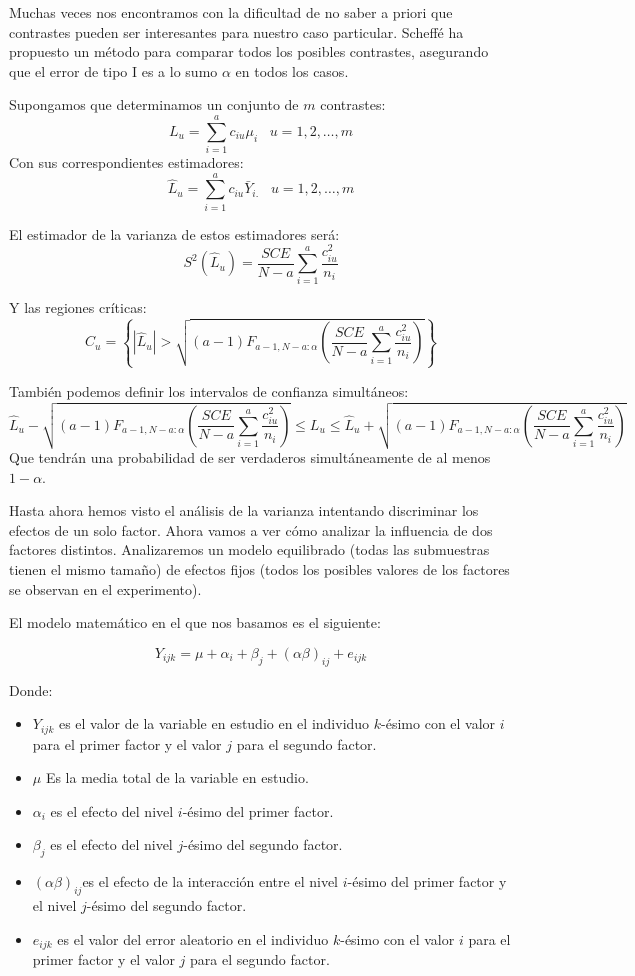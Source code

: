 Muchas veces nos encontramos con la dificultad de no saber a priori que contrastes pueden ser interesantes para nuestro caso particular. Scheff\'e ha propuesto un m\'etodo para comparar todos los posibles contrastes, asegurando que el error de tipo I es a lo sumo $\alpha$ en todos los casos.

Supongamos que determinamos un conjunto de $m$ contrastes:
\[L_u=\sum_{i=1}^ac_{iu}\mu_i\;\;\;u=1,2,\ldots,m\]
Con sus correspondientes estimadores:
\[\hat{L}_u=\sum_{i=1}^ac_{iu}\bar{Y}_{i.}\;\;\;u=1,2,\ldots,m\]

El estimador de la varianza de estos estimadores ser\'a:
\[S^2(\hat{L}_u)=\dfrac{SCE}{N-a}\sum_{i=1}^a\dfrac{c_{iu}^2}{n_i}\]

Y las regiones cr\'iticas:
\[C_u=\left\{|\hat{L}_u|>\sqrt{(a-1)F_{a-1,N-a:\alpha}\left(\dfrac{SCE}{N-a}\sum_{i=1}^a\dfrac{c_{iu}^2}{n_i}\right)}\right\}\]

Tambi\'en podemos definir los intervalos de confianza simult\'aneos:
\[\hat{L}_u-\sqrt{(a-1)F_{a-1,N-a:\alpha}\left(\dfrac{SCE}{N-a}\sum_{i=1}^a\dfrac{c_{iu}^2}{n_i}\right)}\leq L_u\leq\hat{L}_u+\sqrt{(a-1)F_{a-1,N-a:\alpha}\left(\dfrac{SCE}{N-a}\sum_{i=1}^a\dfrac{c_{iu}^2}{n_i}\right)}\]
Que tendr\'an una probabilidad de ser verdaderos simult\'aneamente de al menos $1-\alpha$.


Hasta ahora hemos visto el an\'alisis de la varianza intentando discriminar los efectos de un solo factor. Ahora vamos a ver c\'omo analizar la influencia de dos factores distintos. Analizaremos un modelo equilibrado (todas las submuestras tienen el mismo tama\~no) de efectos fijos (todos los posibles valores de los factores se observan en el experimento).

El modelo matem\'atico en el que nos basamos es el siguiente:

\[Y_{ijk}=\mu+\alpha_i+\beta_j+(\alpha\beta)_{ij}+e_{ijk}\]

Donde:
\begin{itemize}
\item $Y_{ijk}$ es el valor de la variable en estudio en el individuo $k$-\'esimo con el valor $i$ para el primer factor y el valor $j$ para el segundo factor.
\item $\mu$ Es la media total de la variable en estudio.
\item $\alpha_i$ es el efecto del nivel $i$-\'esimo del primer factor.
\item $\beta_j$ es el efecto del nivel $j$-\'esimo del segundo factor.
\item $(\alpha\beta)_{ij}$es el efecto de la interacci\'on entre el nivel $i$-\'esimo del primer factor y el nivel $j$-\'esimo del segundo factor.
\item $e_{ijk}$ es el valor del error aleatorio en el individuo $k$-\'esimo con el valor $i$ para el primer factor y el valor $j$ para el segundo factor.
\end{itemize} 

